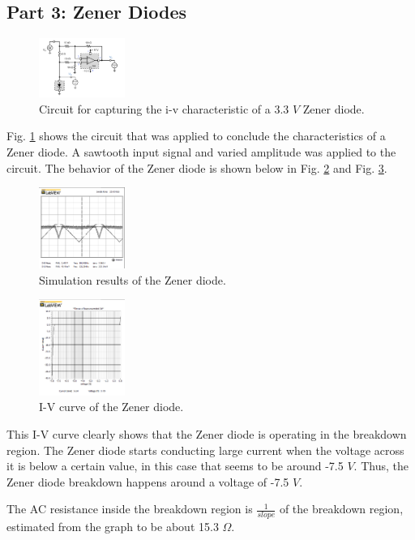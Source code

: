 \documentclass[letterpaper, 10 pt, conference]{ieeeconf}  %
\begin{document}
\subsection{Part 3: Zener Diodes}
\begin{figure}[ht]
  \centering
  \includegraphics[width=0.25\textwidth]{images/zener_circuit.png}
  \caption{Circuit for capturing the i-v characteristic of a 3.3 $V$ Zener diode.}
  \label{fig:zener_1}
\end{figure}
Fig. \ref{fig:zener_1} shows the circuit that was applied to conclude the characteristics of
a Zener diode. A sawtooth input signal and varied amplitude was applied to the circuit. The behavior
of the Zener diode is shown below in Fig. \ref{fig:zener_2} and Fig. \ref{fig:zener_3}.
\begin{figure}[ht]
  \centering
  \includegraphics[width=0.25\textwidth]{images/zener_simu.png}
  \caption{Simulation results of the Zener diode.}
  \label{fig:zener_2}
\end{figure}
\begin{figure}[ht]
  \centering
  \includegraphics[width=0.25\textwidth]{images/zener_iv.png}
  \caption{I-V curve of the Zener diode.}
  \label{fig:zener_3}
\end{figure}
This I-V curve clearly shows that the Zener diode is operating in the breakdown region.
The Zener diode starts conducting large current when the voltage across it is below
a certain value, in this case that seems to be around -7.5 $V$.
Thus, the Zener diode breakdown happens around a voltage of -7.5 $V$.
\par The AC resistance inside the breakdown region is $\frac{1}{slope}$ of the breakdown region,
estimated from the graph to be about 15.3 $\Omega$.
\end{document}
